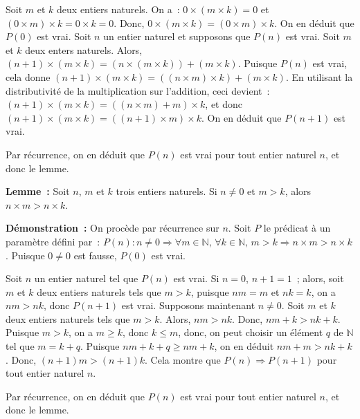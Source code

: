     Soit $m$ et $k$ deux entiers naturels. 
    On a : $0 \times (m \times k) = 0$ et $(0 \times m) \times k = 0 \times k = 0$. 
    Donc, $0 \times (m \times k) = (0 \times m) \times k$. 
    On en déduit que $P(0)$ est vrai. 
    Soit $n$ un entier naturel et supposons que $P(n)$ est vrai. 
    Soit $m$ et $k$ deux enters naturels. 
    Alors, $(n+1) \times (m \times k) = (n \times (m \times k)) + (m \times k)$. 
    Puisque $P(n)$ est vrai, cela donne $(n+1) \times (m \times k) = ((n \times m) \times k) + (m \times k)$. 
    En utilisant la distributivité de la multiplication sur l'addition, ceci devient : $(n+1) \times (m \times k) = ((n \times m) + m) \times k$, et donc $(n+1) \times (m \times k) = ((n + 1) \times m) \times k$.
    On en déduit que $P(n+1)$ est vrai. 
    
    Par récurrence, on en déduit que $P(n)$ est vrai pour tout entier naturel $n$, et donc le lemme.

   \done 

\medskip

\noindent\textbf{Lemme :} Soit $n$, $m$ et $k$ trois entiers naturels. Si $n \neq 0$ et $m > k$, alors $n \times m > n \times k$.

\medskip

\noindent\textbf{Démonstration :} On procède par récurrence sur $n$. 
    Soit $P$ le prédicat à un paramètre défini par : $P(n): n \neq 0 \Rightarrow \forall m \in \mathbb{N}, \, \forall k \in \mathbb{N}, \, m > k \Rightarrow n \times m > n \times k$. 
    Puisque $0 \neq 0$ est fausse, $P(0)$ est vrai. 

    Soit $n$ un entier naturel tel que $P(n)$ est vrai. 
    Si $n = 0$, $n+1 = 1$ ; alors, soit $m$ et $k$ deux entiers naturels tels que $m > k$, puisque $n m = m$ et $n k = k$, on a $n m > n k$, donc $P(n+1)$ est vrai. 
    Supposons maintenant $n \neq 0$. 
    Soit $m$ et $k$ deux entiers naturels tels que $m > k$. 
    Alors, $n m > n k$.
    Donc, $n m + k > n k + k$. 
    Puisque $m > k$, on a $m \geq k$, donc $k \leq m$, donc, on peut choisir un élément $q$ de $\mathbb{N}$ tel que $m = k + q$.
    Puisque $n m + k + q \geq n m + k$, on en déduit $n m + m > n k + k$.
    Donc, $(n+1) m > (n+1) k$. 
    Cela montre que $P(n) \Rightarrow P(n+1)$ pour tout entier naturel $n$. 

    Par récurrence, on en déduit que $P(n)$ est vrai pour tout entier naturel $n$, et donc le lemme.

   \done 

\medskip

